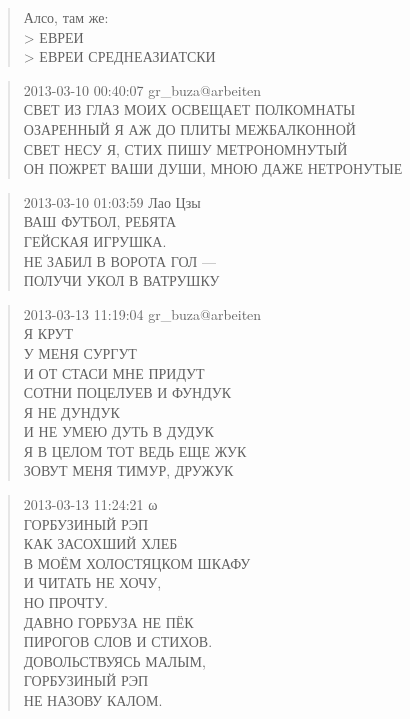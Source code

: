 \poemtitle{***}
\begin{verse}
Алсо, там же:\\
> ЕВРЕИ\\
> ЕВРЕИ СРЕДHЕАЗИАТСКИ
\end{verse}

\poemtitle{***}
\begin{verse}
2013-03-10 00:40:07 gr\_buza@arbeiten\\
СВЕТ ИЗ ГЛАЗ МОИХ ОСВЕЩАЕТ ПОЛКОМНАТЫ\\
ОЗАРЕННЫЙ Я АЖ ДО ПЛИТЫ МЕЖБАЛКОННОЙ\\
СВЕТ НЕСУ Я, СТИХ ПИШУ МЕТРОНОМНУТЫЙ\\
ОН ПОЖРЕТ ВАШИ ДУШИ, МНОЮ ДАЖЕ НЕТРОНУТЫЕ
\end{verse}

\poemtitle{***}
\begin{verse}
2013-03-10 01:03:59 Лао Цзы\\
ВАШ ФУТБОЛ, РЕБЯТА\\
ГЕЙСКАЯ ИГРУШКА.\\
НЕ ЗАБИЛ В ВОРОТА ГОЛ —\\
ПОЛУЧИ УКОЛ В ВАТРУШКУ
\end{verse}

\poemtitle{***}
\begin{verse}
2013-03-13 11:19:04 gr\_buza@arbeiten\\
Я КРУТ\\
У МЕНЯ СУРГУТ\\
И ОТ СТАСИ МНЕ ПРИДУТ\\
СОТНИ ПОЦЕЛУЕВ И ФУНДУК\\
Я НЕ ДУНДУК\\
И НЕ УМЕЮ ДУТЬ В ДУДУК\\
Я В ЦЕЛОМ ТОТ ВЕДЬ ЕЩЕ ЖУК\\
ЗОВУТ МЕНЯ ТИМУР, ДРУЖУК
\end{verse}

\poemtitle{***}
\begin{verse}
2013-03-13 11:24:21 ω\\
ГОРБУЗИНЫЙ РЭП\\
КАК ЗАСОХШИЙ ХЛЕБ\\
В МОЁМ ХОЛОСТЯЦКОМ ШКАФУ\\
И ЧИТАТЬ НЕ ХОЧУ,\\
     НО ПРОЧТУ.\\
ДАВНО ГОРБУЗА НЕ ПЁК\\
ПИРОГОВ СЛОВ И СТИХОВ.\\
ДОВОЛЬСТВУЯСЬ МАЛЫМ,\\
ГОРБУЗИНЫЙ РЭП\\
    НЕ НАЗОВУ КАЛОМ.
\end{verse}

